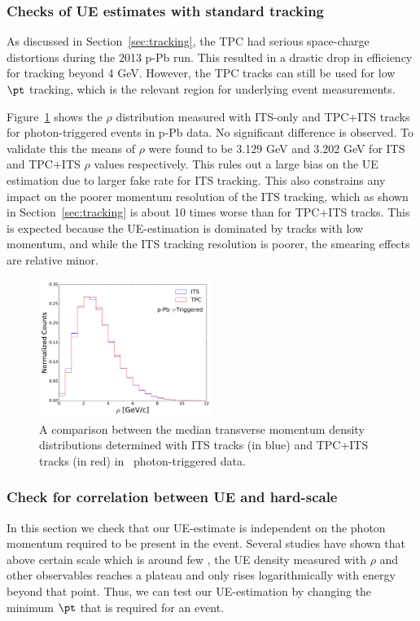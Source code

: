 \subsubsection{Checks of UE estimates with standard tracking }
As discussed in Section~\ref{sec:tracking}, the TPC had serious space-charge distortions during the 2013 p-Pb run. This resulted in a drastic drop in efficiency for tracking beyond 4 GeV. However, the TPC tracks can still be used for low $\pt$ tracking, which is the relevant region for underlying event measurements. 

Figure~\ref{fig:pPb_its_tpc_rho} shows the $\rho$ distribution measured with ITS-only and TPC+ITS tracks for photon-triggered events in p-Pb data. No significant difference is observed. To validate this the means of $\rho$ were found to be 3.129 GeV and 3.202 GeV for ITS and TPC+ITS $\rho$ values respectively. This rules out a large bias on the UE estimation due to larger fake rate for ITS tracking. This also constrains any impact on the poorer momentum resolution of the ITS tracking, which as shown in Section~\ref{sec:tracking} is about 10 times worse than for TPC+ITS tracks. This is expected because the UE-estimation is dominated by tracks with low momentum, and while the ITS tracking resolution is poorer, the smearing effects are relative minor. 

\begin{figure}
	\center
	\includegraphics[width=0.5\textwidth]{JetReco/pPb_its_tpc_rho.pdf}
	\caption{A comparison between the median transverse momentum density distributions determined with ITS tracks (in blue) and TPC+ITS tracks (in red) in \pPb~photon-triggered data.}
	\label{fig:pPb_its_tpc_rho}
\end{figure}

\FloatBarrier
\subsubsection{Check for correlation between UE and hard-scale}
In this section we check that our UE-estimate is independent on the photon momentum required to be present in the event. Several studies have shown that above certain scale which is around few \GeVc, the UE density measured with $\rho$ and other observables reaches a plateau and only rises logarithmically with energy beyond that point. Thus, we can test our UE-estimation by changing the minimum $\pt$ that is required for an event. 

